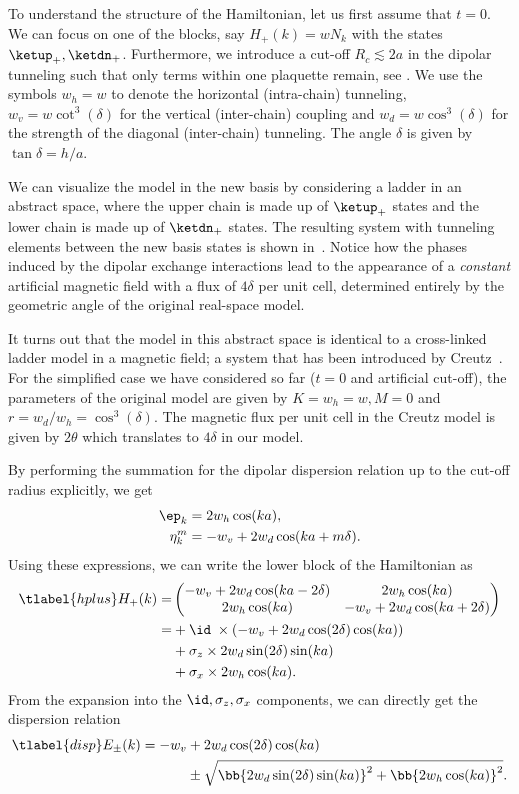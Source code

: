 To understand the structure of the Hamiltonian, let us first assume that $t=0$.
We can focus on one of the blocks, say $H_+(k) = w N_k$ with the states $\ketup_+, \ketdn_+$.
Furthermore, we introduce a cut-off $R_c \lesssim 2a$ in the dipolar tunneling such that only terms within one plaquette remain, see .
We use the symbols $w_h = w$ to denote the horizontal (intra-chain) tunneling, $w_v = w \cot^3(\delta)$ for the vertical (inter-chain) coupling and $w_d = w \cos^3(\delta)$ for the strength of the diagonal (inter-chain) tunneling.
The angle $\delta$ is given by $\tan \delta = h/a$.

We can visualize the model in the new basis by considering a ladder in an abstract space, where the upper chain is made up of $\ketup_+$ states and the lower chain is made up of $\ketdn_+$ states.
The resulting system with tunneling elements between the new basis states is shown in~.
Notice how the phases induced by the dipolar exchange interactions lead to the appearance of a \emph{constant} artificial magnetic field with a flux of $4\delta$ per unit cell, determined entirely by the geometric angle of the original real-space model.

It turns out that the model in this abstract space is identical to a cross-linked ladder model in a magnetic field; a system that has been introduced by Creutz~\cite{Creutz1999}.
For the simplified case we have considered so far ($t=0$ and artificial cut-off), the parameters of the original model are given by $K=w_h=w, M=0$ and $r=w_d/w_h=\cos^3(\delta)$.
The magnetic flux per unit cell in the Creutz model is given by $2\theta$ which translates to $4\delta$ in our model.

By performing the summation for the dipolar dispersion relation up to the cut-off radius explicitly, we get
\begin{align}
    \ep_k &= 2 w_h \cos(ka), \\
    \eta_k^m &= -w_v + 2 w_d \cos(ka + m\delta).
\end{align}
Using these expressions, we can write the lower block of the Hamiltonian as
\begin{align} \tlabel{hplus}
    H_+(k) = &\begin{pmatrix}
        -w_v + 2w_d \cos(ka-2\delta) & 2w_h \cos(ka) \\
        2w_h\cos(ka) & -w_v + 2w_d \cos(ka+2\delta)
    \end{pmatrix} \\
    = &+\id \; \times (-w_v + 2w_d \cos(2\delta) \cos(ka)) \\
    &+\sigma_z \times 2w_d \sin(2\delta) \sin(ka) \\
    &+\sigma_x \times 2w_h \cos(ka).
\end{align}
From the expansion into the $\id, \sigma_z, \sigma_x$ components, we can directly get the dispersion relation
\begin{align} \tlabel{disp}
    E_\pm(k) = -w_v &+ 2w_d \cos(2\delta)\cos(ka) \\
                    &\pm \sqrt{ \bb{ 2w_d\sin(2\delta)\sin(ka) }^2 + \bb{ 2w_h\cos(ka) }^2 }.
\end{align}

